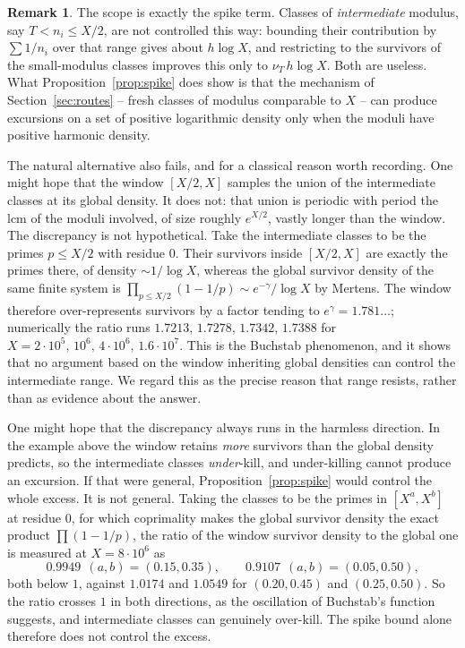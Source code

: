 \documentclass[11pt]{article}
\theoremstyle{plain}
\theoremstyle{definition}
\newtheorem{remark}[theorem]{Remark}
\begin{document}
\begin{remark}\label{rem:intermediate}
The scope is exactly the spike term.  Classes of \emph{inter\-mediate}
modulus, say $T<n_i\le X/2$, are not controlled this way:
bounding their contribution by $\sum1/n_i$ over that range gives
about $h\log X$, and restricting to the survivors of the
small-modulus classes improves this only to $\nu_T\,h\log X$.
Both are useless.  What Proposition~\ref{prop:spike} does show
is that the mechanism of Section~\ref{sec:routes} -- fresh classes of modulus
comparable to $X$ -- can produce excursions on a set of positive
logarithmic density only when the moduli have positive harmonic
density.

The natural alternative also fails, and for a classical reason
worth recording.  One might hope that the window $[X/2,X]$
samples the union of the intermediate classes at its global
density.  It does not: that union is periodic with period the
lcm of the moduli involved, of size roughly $e^{X/2}$, vastly
longer than the window.  The discrepancy is not hypothetical.
Take the intermediate classes to be the primes $p\le X/2$ with
residue $0$.  Their survivors inside $[X/2,X]$ are exactly the
primes there, of density $\sim1/\log X$, whereas the global
survivor density of the same finite system is
$\prod_{p\le X/2}(1-1/p)\sim e^{-\gamma}/\log X$ by Mertens.  The
window therefore over-represents survivors by a factor tending
to $e^{\gamma}=1.781\ldots$; numerically the ratio runs
$1.7213$, $1.7278$, $1.7342$, $1.7388$ for
$X=2\cdot10^5,\,10^6,\,4\cdot10^6,\,1.6\cdot10^7$.  This is the
Buchstab phenomenon, and it shows that no argument based on the
window inheriting global densities can control the intermediate
range.  We regard this as the precise reason that range resists,
rather than as evidence about the answer.

One might hope that the discrepancy always runs in the harmless
direction.  In the example above the window retains \emph{more}
survivors than the global density predicts, so the intermediate
classes \emph{under}-kill, and under-killing cannot produce an
excursion.  If that were general, Proposition~\ref{prop:spike}
would control the whole excess.  It is not general.  Taking the
classes to be the primes in $[X^{a},X^{b}]$ at residue $0$, for
which coprimality makes the global survivor density the exact
product $\prod(1-1/p)$, the ratio of the window survivor density
to the global one is measured at $X=8\cdot10^6$ as
\[
  0.9949\ \ (a,b)=(0.15,0.35),\qquad
  0.9107\ \ (a,b)=(0.05,0.50),
\]
both below $1$, against $1.0174$ and $1.0549$ for
$(0.20,0.45)$ and $(0.25,0.50)$.  So the ratio crosses $1$ in
both directions, as the oscillation of Buchstab's function
suggests, and intermediate classes can genuinely over-kill.  The
spike bound alone therefore does not control the excess.
\end{remark}
\end{document}
